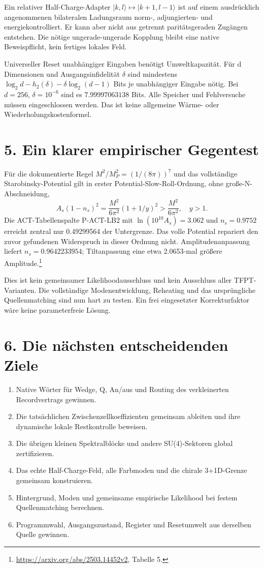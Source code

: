 Ein relativer Half-Charge-Adapter $|k,l\rangle\mapsto|k+1,l-1\rangle$ ist auf einem ausdrücklich angenommenen bilateralen Ladungsraum norm-, adjungierten- und energiekontrolliert. Er kann aber nicht aus getrennt paritätsgeraden Zugängen entstehen. Die nötige ungerade-ungerade Kopplung bleibt eine native Beweispflicht, kein fertiges lokales Feld.

Universeller Reset unabhängiger Eingaben benötigt Umweltkapazität. Für d Dimensionen und Ausgangsinfidelität $\delta$ sind mindestens $\log_2d-h_2(\delta)-\delta\log_2(d-1)$ Bits je unabhängiger Eingabe nötig. Bei $d=256$, $\delta=10^{-6}$ sind es $7.99997063138$ Bits. Alle Speicher und Fehlversuche müssen eingeschlossen werden. Das ist keine allgemeine Wärme- oder Wiederholungskostenformel.

\section*{5. Ein klarer empirischer Gegentest}
Für die dokumentierte Regel $M^2/M_P^2=(1/(8\pi))^7$ und das vollständige Starobinsky-Potential gilt in erster Potential-Slow-Roll-Ordnung, ohne große-N-Abschneidung,
\[
A_s(1-n_s)^2=\frac{M^2}{6\pi^2}(1+1/y)^2>\frac{M^2}{6\pi^2},\quad y>1.
\]
Die ACT-Tabellenspalte P-ACT-LB2 mit $\ln(10^{10}A_s)=3.062$ und $n_s=0.9752$ erreicht zentral nur 0.49299564 der Untergrenze. Das volle Potential repariert den zuvor gefundenen Widerspruch in dieser Ordnung nicht. Amplitudenanpassung liefert $n_s=0.9642233954$; Tiltanpassung eine etwa 2.0653-mal größere Amplitude.\footnote{\url{https://arxiv.org/abs/2503.14452v2}, Tabelle 5.}

Dies ist kein gemeinsamer Likelihoodausschluss und kein Ausschluss aller TFPT-Varianten. Die vollständige Modenentwicklung, Reheating und das ursprüngliche Quellenmatching sind nun hart zu testen. Ein frei eingesetzter Korrekturfaktor wäre keine parameterfreie Lösung.

\section*{6. Die nächsten entscheidenden Ziele}
\begin{enumerate}
\item Native Wörter für Wedge, Q, An/aus und Routing des verkleinerten Recordvertrags gewinnen.
\item Die tatsächlichen Zwischenzellkoeffizienten gemeinsam ableiten und ihre dynamische lokale Restkontrolle beweisen.
\item Die übrigen kleinen Spektralblöcke und andere SU(4)-Sektoren global zertifizieren.
\item Das echte Half-Charge-Feld, alle Farbmoden und die chirale 3+1D-Grenze gemeinsam konstruieren.
\item Hintergrund, Moden und gemeinsame empirische Likelihood bei festem Quellenmatching berechnen.
\item Programmwahl, Ausgangszustand, Register und Resetumwelt aus derselben Quelle gewinnen.
\end{enumerate}

